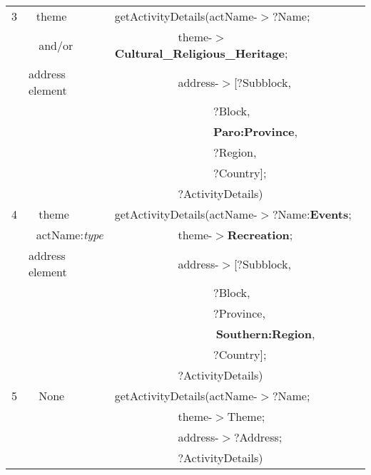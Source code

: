 \begin{table} [tbph]
\begin{tabular}{|l|l|l|}
\hline
 3&$~~~$theme & getActivityDetails(actName-$>?$Name;\\
  &$~~~~$and/or      &$~~~~~~~~~~~~~~~~~~~~~~~~~$theme-$>$\textbf{Cultural\_Religious\_Heritage}; \\
  & address element      &$~~~~~~~~~~~~~~~~~~~~~~~~~$address-$>$[?Subblock, \\
  &                       &$~~~~~~~~~~~~~~~~~~~~~~~~~~~~~~~~~~~~~~~?$Block, \\
  &                       &$~~~~~~~~~~~~~~~~~~~~~~~~~~~~~~~~~~~~~~~$\textbf{Paro:Province},\\
  &                       &$~~~~~~~~~~~~~~~~~~~~~~~~~~~~~~~~~~~~~~~?$Region, \\
  &                       &$~~~~~~~~~~~~~~~~~~~~~~~~~~~~~~~~~~~~~~~?$Country]; \\
  &                 &$~~~~~~~~~~~~~~~~~~~~~~~~~?$ActivityDetails)\\          
\hline 
 4&$~~~~$theme & getActivityDetails(actName-$>?$Name:\textbf{Events};\\
  &$~~~$actName:\emph{type}    &$~~~~~~~~~~~~~~~~~~~~~~~~~$theme-$>$\textbf{Recreation}; \\
  & address element      &$~~~~~~~~~~~~~~~~~~~~~~~~~$address-$>$[?Subblock, \\
  &                       &$~~~~~~~~~~~~~~~~~~~~~~~~~~~~~~~~~~~~~~~?$Block, \\
  &                       &$~~~~~~~~~~~~~~~~~~~~~~~~~~~~~~~~~~~~~~~?$Province,\\
  &                       &$~~~~~~~~~~~~~~~~~~~~~~~~~~~~~~~~~~~~~~~~$\textbf{Southern:Region}, \\
  &                       &$~~~~~~~~~~~~~~~~~~~~~~~~~~~~~~~~~~~~~~~?$Country]; \\
  &                 &$~~~~~~~~~~~~~~~~~~~~~~~~~?$ActivityDetails)\\        
 \hline
 5&$~~~~$None              & getActivityDetails(actName-$>?$Name;\\
  &    &$~~~~~~~~~~~~~~~~~~~~~~~~~$theme-$>$Theme; \\
  &       &$~~~~~~~~~~~~~~~~~~~~~~~~~$address-$>?$Address; \\
  &      &$~~~~~~~~~~~~~~~~~~~~~~~~~?$ActivityDetails)\\ 
\hline 
\end{tabular} 
\end{table}

